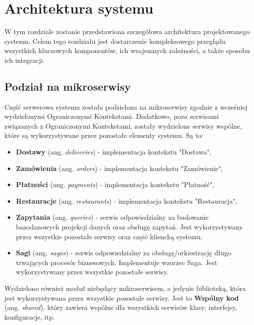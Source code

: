 \clearpage %

\section{Architektura systemu}

W tym rozdziale zostanie przedstawiona szczegółowa architektura projektowanego systemu. Celem tego rozdziału jest dostarczenie kompleksowego przeglądu wszystkich kluczowych komponentów, ich wzajemnych zależności, a także sposobu ich integracji.

\subsection{Podział na mikroserwisy}

Część serwerowa systemu została podzielona na mikroserwisy zgodnie z wcześniej wydzielonymi Ograniczonymi Kontekstami. Dodatkowo, poza serwisami związanych z Ograniczonymi Kontekstami, zostały wydzielone serwisy wspólne, które są wykorzystywane przez pozostałe elementy systemu. Są to:

\begin{itemize}

    \item \textbf{Dostawy} (ang. \textit{deliveries}) - implementacja kontekstu "Dostawa",
    \item \textbf{Zamówienia} (ang. \textit{orders}) - implementacja kontekstu "Zamówienie",
    \item \textbf{Płatności} (ang. \textit{payments}) - implementacja kontekstu "Płatność",
    \item \textbf{Restauracje} (ang. \textit{restaurants}) - implementacja kontekstu "Restauracja",
    \item \textbf{Zapytania} (ang. \textit{queries}) - serwis odpowiedzialny za budowanie bazodanowych projekcji danych oraz obsługę zapytań. Jest wykorzystywany przez wszystkie pozostałe serwisy oraz część kliencką systemu,
    \item \textbf{Sagi} (ang. \textit{sagas}) - serwis odpowiedzialny za obsługę/orkiestrację długo trwających procesór biznesowych. Implementuje wzorzec Saga. Jest wykorzystywany przez wszystkie pozostałe serwisy.

\end{itemize}

Wydzielono również moduł niebędący mikroserwisem, a jedynie biblioteką, która jest wykorzystywana przez wszystkie pozostałe serwisy. Jest to \textbf{Wspólny kod} (ang. \textit{shared}), który zawiera wspólne dla wszystkich serwisów klasy, interfejsy, konfiguracje, itp.

